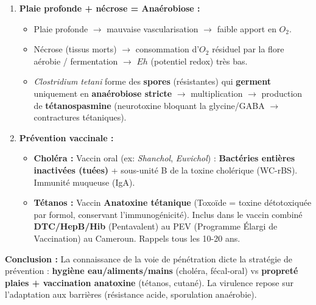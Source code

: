 \documentclass[11pt]{article}
\begin{document}
\begin{exoresolu}
\begin{enumerate}
              \begin{itemize}
                  \item \textbf{Dose infectante élevée} ($10^6$ à $10^8$ bactéries) : « effet de nombre », certaines survivent.
                  \item \textbf{Protection par le véhicule alimentaire :} Les aliments (riz, mil, maïs bouillis tièdes) tamponnent l'acidité gastrique, protégeant les bactéries pendant le transit gastrique.
                  \item \textbf{Adaptation physiologique :} Synthèse de systèmes tampons intracellulaires (consommation de $H^+$), modification des lipides de membrane pour résister au pH bas.
              \end{itemize}
        \item \textbf{Plaie profonde + nécrose = Anaérobiose :}
              \begin{itemize}
                  \item Plaie profonde $\rightarrow$ mauvaise vascularisation $\rightarrow$ faible apport en $O_2$.
                  \item Nécrose (tissus morts) $\rightarrow$ consommation d'$O_2$ résiduel par la flore aérobie / fermentation $\rightarrow$ $Eh$ (potentiel redox) très bas.
                  \item \emph{Clostridium tetani} forme des \textbf{spores} (résistantes) qui \textbf{germent} uniquement en \textbf{anaérobiose stricte} $\rightarrow$ multiplication $\rightarrow$ production de \textbf{tétanospasmine} (neurotoxine bloquant la glycine/GABA $\rightarrow$ contractures tétaniques).
              \end{itemize}
        \item \textbf{Prévention vaccinale :}
              \begin{itemize}
                  \item \textbf{Choléra :} Vaccin oral (ex: \emph{Shanchol}, \emph{Euvichol}) : \textbf{Bactéries entières inactivées (tuées)} + sous-unité B de la toxine cholérique (WC-rBS). Immunité muqueuse (IgA).
                  \item \textbf{Tétanos :} Vaccin \textbf{Anatoxine tétanique} (Toxoïde = toxine détotoxiquée par formol, conservant l'immunogénicité). Inclus dans le vaccin combiné \textbf{DTC/HepB/Hib} (Pentavalent) au PEV (Programme Élargi de Vaccination) au Cameroun. Rappels tous les 10-20 ans.
              \end{itemize}
    \end{enumerate}
    \textbf{Conclusion :} La connaissance de la voie de pénétration dicte la stratégie de prévention : \textbf{hygiène eau/aliments/mains} (choléra, fécal-oral) vs \textbf{propreté plaies + vaccination anatoxine} (tétanos, cutané). La virulence repose sur l'adaptation aux barrières (résistance acide, sporulation anaérobie).
\end{exoresolu}
\end{document}
